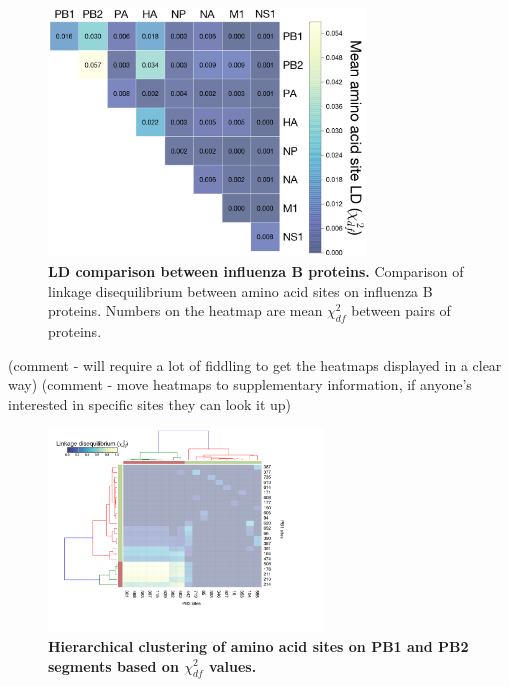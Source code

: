 \documentclass[11pt,oneside,letterpaper]{article}
\begin{document}
\begin{figure}[h]
	\centering	
	\includegraphics[width=0.75\textwidth]	{figures/InfB_segmentLD.png}
	\caption{\textbf{LD comparison between influenza B proteins.}
Comparison of linkage disequilibrium between amino acid sites on influenza B proteins.
Numbers on the heatmap are mean $\chi^{2}_{df}$ between pairs of proteins.}
	\label{segmentLD}
\end{figure}



(comment - will require a lot of fiddling to get the heatmaps displayed in a clear way)
(comment - move heatmaps to supplementary information, if anyone's interested in specific sites they can look it up)
\begin{figure}[h]
	\centering	
	\includegraphics[width=0.65\textwidth]	{figures/Chi_PB1_PB2.png}
	\caption{\textbf{Hierarchical clustering of amino acid sites on PB1 and PB2 segments based on $\chi^{2}_{df}$ values.}}
	\label{ChiPB1PB2}
\end{figure}
\end{document}
